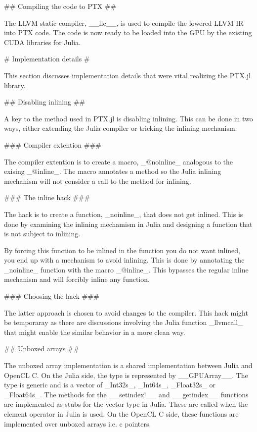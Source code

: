 \begin{markdown}
## Compiling the code to PTX ##

The LLVM static compiler, __llc__, is used to compile the lowered LLVM
IR into PTX code. The code is now ready to be loaded into the GPU by
the existing CUDA libraries for Julia.

# Implementation details #
\label{sec:implementation-details}

This section discusses implementation details that were vital
realizing the PTX.jl library.

## Disabling inlining ##

A key to the method used in PTX.jl is disabling inlining. This can be
done in two ways, either extending the Julia compiler or tricking the
inlining mechanism.

### Compiler extention ###

The compiler extention is to create a macro, _@noinline_ analogous to
the exising _@inline_. The macro annotates a method so the Julia
inlining mechanism will not consider a call to the method for
inlining.

### The inline hack ###

The hack is to create a function, _noinline_, that does not get
inlined. This is done by examining the inlining mechamism in Julia and
designing a function that is not subject to inlining.

By forcing this function to be inlined in the function you do not want
inlined, you end up with a mechanism to avoid inlining. This is done
by annotating the _noinline_ function with the macro _@inline_. This
bypasses the regular inline mechanism and will forcibly inline any
function.

### Choosing the hack ###

The latter approach is chosen to avoid changes to the compiler. This
hack might be temporaray as there are discussions involving the Julia
function _llvmcall_ that might enable the similar behavior in a more
clean way.

## Unboxed arrays ##
\label{sec:implementation-details-unboxed}

The unboxed array implementation is a shared implementation between
Julia and OpenCL C. On the Julia side, the type is represented by
__GPUArray__. The type is generic and is a vector of _Int32s_,
_Int64s_, _Float32s_ or _Float64s_. The methods for the __setindex!__
and __getindex__ functions are implemented as stubs for the vector
type in Julia. These are called when the element operator in Julia is
used. On the OpenCL C side, these functions are implemented over
unboxed arrays i.e. c pointers. 


\end{markdown}
